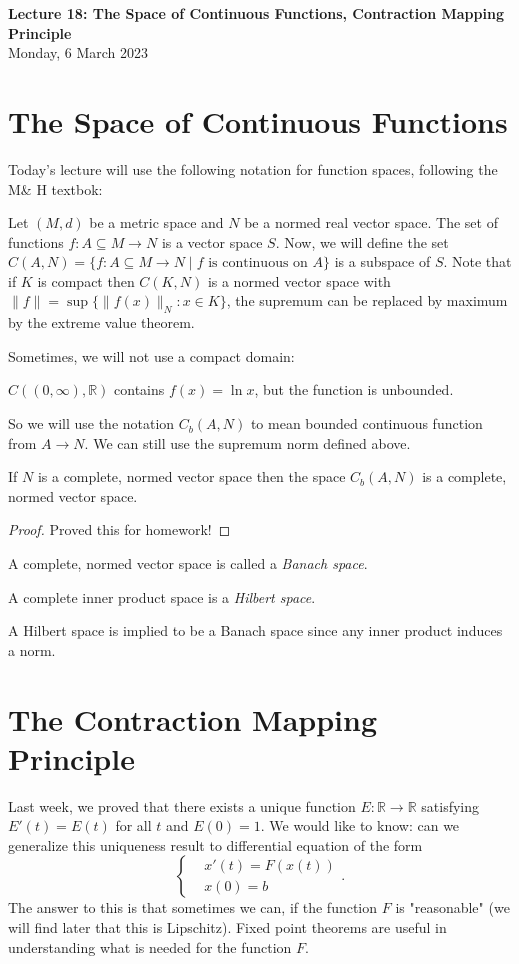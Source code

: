\documentclass[11pt]{article}
\theoremstyle{definition}
\newcommand{\R}{\mathbb{R}}                      %
\begin{document}
\thispagestyle{empty}

\begin{center}
{\LARGE \bf Lecture 18: The Space of Continuous Functions, Contraction Mapping Principle}\\
{\large Monday, 6 March 2023}\\
\end{center}
\section{The Space of Continuous Functions}

Today's lecture will use the following notation for function spaces, following the M\& H textbok:

Let $(M,d)$ be a metric space and $N$ be a normed real vector space. The set of functions $f:A\subseteq M\to N$ is a vector space $S$. Now, we will define the set $C(A,N)=\{f:A\subseteq M\to N\;|\;\mbox{$f$ is continuous on $A$}\}$ is a subspace of $S$. Note that if $K$ is compact then $C(K,N)$ is a normed vector space with $\|f\|=\sup\{\|f(x)\|_N : x\in K\}$, the supremum can be replaced by maximum by the extreme value theorem.

Sometimes, we will not use a compact domain:

\ex $C((0,\infty),\R)$ contains $f(x)=\ln{x}$, but the function is unbounded.

So we will use the notation $C_b (A,N)$ to mean bounded continuous function from $A\to N$. We can still use the supremum norm defined above.

\prop If $N$ is a complete, normed vector space then the space $C_b (A,N)$ is a complete, normed vector space.

\begin{proof}
    Proved this for homework!
\end{proof}

\begin{mdframed}[backgroundcolor = blue!10]
\vspace{+0.2cm}

 A complete, normed vector space is called a \textit{Banach space}.

 A complete inner product space is a \textit{Hilbert space}.
\end{mdframed}
\note A Hilbert space is implied to be a Banach space since any inner product induces a norm.

\section{The Contraction Mapping Principle}
Last week, we proved that there exists a unique function $E:\R\to\R$ satisfying $E'(t)=E(t)$ for all $t$ and $E(0)=1$. We would like to know: can we generalize this uniqueness result to differential equation of the form 
$$
\left\{\begin{aligned}
&x'(t)=F(x(t))\\
&x(0)=b
\end{aligned}\right. .
$$
The answer to this is that sometimes we can, if the function $F$ is "reasonable" (we will find later that this is Lipschitz). Fixed point theorems are useful in understanding what is needed for the function $F$.
\end{document}
